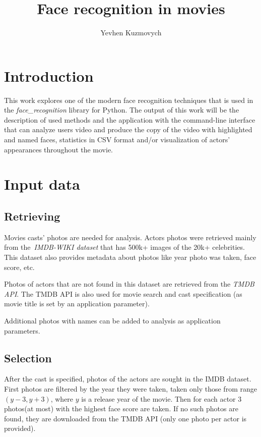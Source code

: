 \documentclass[hidelinks, english]{mvi-report}
\title{Face recognition in movies}
\author{Yevhen Kuzmovych}
\affiliation{ČVUT - FIT}
\begin{document}
\maketitle

\section{Introduction}
This work explores one of the modern face recognition techniques that is used in
the \textit{face\_recognition}\cite{face_recognition} library for Python. The output of this work will be
the description of used methods and the application with the command-line interface that can analyze users video and
produce the copy of the video with highlighted and named faces, statistics in CSV format and/or visualization of actors'
appearances throughout the movie.

\section{Input data}

\subsection{Retrieving}
Movies casts' photos are needed for analysis. Actors photos were retrieved mainly from
the~\textit{IMDB-WIKI dataset}\cite{Rothe-IJCV-2016} that has 500k+ images of the 20k+ celebrities. This dataset also
provides metadata about photos like year photo was taken, face score, etc.

Photos of actors that are not found in this dataset are retrieved from the \textit{TMDB API}\cite{tmdb-api}.
The TMDB API is also used for movie search and cast specification (as movie title is set by an application
parameter).

Additional photos with names can be added to analysis as application parameters.

\subsection{Selection}
After the cast is specified, photos of the actors are sought in the IMDB dataset. First photos are filtered by the year
they were taken, taken only those from range \( (y-3, y+3) \), where \(y\) is a release year of the movie. Then for
each actor 3 photos(at most) with the highest face score are taken. If no such photos are found, they are downloaded
from the TMDB API (only one photo per actor is provided).
\end{document}
